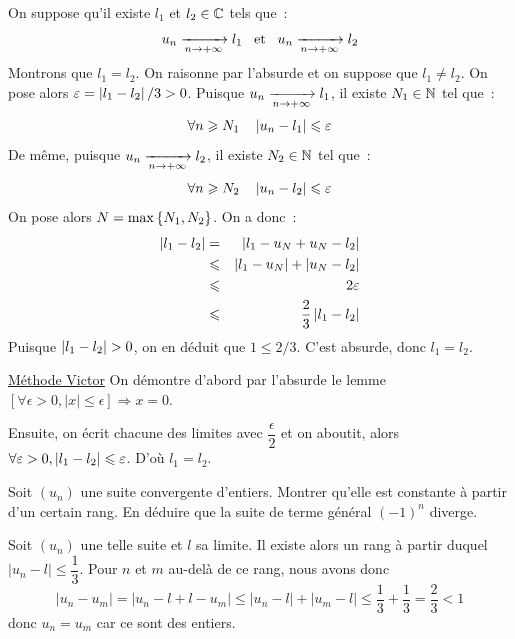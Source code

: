 \documentclass{magnoliaold}
\begin{document}
\begin{preuve}
On suppose qu'il existe $l_1$ et $l_2\in\mathbb{C}$ tels que~:
\[u_n\xrightarrow[n\rightarrow +\infty]{} l_1 \quad\!\text{et}\quad\! u_n\xrightarrow[n\rightarrow +\infty]{} l_2\]
Montrons que $l_1=l_2$. On raisonne par l'absurde et on suppose que
$l_1\neq l_2$. On pose alors $\varepsilon=\left|l_1-l_2\right|/3>0$. Puisque
$u_n\xrightarrow[n\rightarrow +\infty]{}l_1$, il existe $N_1\in\mathbb{N}$ tel que~:
\[\forall n\geqslant N_1 \quad \left|u_n-l_1\right|\leqslant \varepsilon\]
De même, puisque $u_n\xrightarrow[n\rightarrow +\infty]{}l_2$, il existe $N_2\in\mathbb{N}$ tel que~:
\[\forall n\geqslant N_2 \quad \left|u_n-l_2\right|\leqslant \varepsilon\]
On pose alors $N=\max\left\{N_1,N_2\right\}$. On a donc~:
\begin{eqnarray*}
\left|l_1-l_2\right|
&=& \left|l_1-u_N+u_N-l_2\right|\\
&\leqslant& \left|l_1-u_N\right| + \left|u_N-l_2\right|\\
&\leqslant& 2\varepsilon\\
&\leqslant& \frac{2}{3}\left|l_1-l_2\right|
\end{eqnarray*}
Puisque $\abs{l_1-l_2}>0$, on en déduit que $1\leq 2/3$. C'est absurde, donc
$l_1=l_2$.\\
\begin{victor}
\underline{Méthode Victor} On démontre d'abord par l'absurde le lemme $\left[\forall \epsilon>0, |x|\leq \epsilon \right] \Longrightarrow x=0$.

Ensuite, on écrit chacune des limites avec $\dfrac{\epsilon}{2}$ et on aboutit, alors $\forall \varepsilon>0, \left|l_1-l_2\right|\leqslant \varepsilon$. D'où $l_1=l_2$.
\end{victor}
\end{preuve}

\begin{exoUnique}
\exo Soit $(u_n)$ une suite convergente d'entiers. Montrer qu'elle
  est constante à partir d'un certain rang. En déduire que la suite de
  terme général $(-1)^n$ diverge.
\end{exoUnique}

\begin{sol}
Soit $(u_n)$ une telle suite et $l$ sa limite. Il existe alors un rang à partir duquel $|u_n-l|\leq \dfrac{1}{3}$. Pour $n$ et $m$ au-delà de ce rang, nous avons donc \[|u_n-u_m|=|u_n-l+l-u_m|\leq|u_n-l|+|u_m-l|\leq \dfrac{1}{3}+\dfrac{1}{3}=\dfrac{2}{3}<1\] donc $u_n=u_m$ car ce sont des entiers.

\end{sol}
\end{document}
